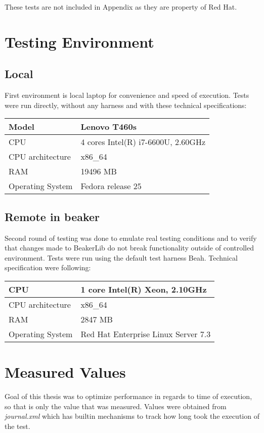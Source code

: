These tests are not included in Appendix as they are property of Red Hat.

\section{Testing Environment}

\subsection{Local}
First environment is local laptop for convenience and speed of execution. Tests were run directly, without any harness and with these technical specifications:  %

\begin{center}
    \begin{tabular}{| l | l |}
    \hline
    Model & Lenovo T460s \\ \hline
    CPU & 4 cores Intel(R) i7-6600U, 2.60GHz \\ \hline
    CPU architecture & x86\_64 \\ \hline
    RAM & 19496 MB   \\ \hline
    Operating System & Fedora release 25 \\ \hline
    \end{tabular}
\end{center}

\subsection{Remote in beaker}
Second round of testing was done to emulate real testing conditions and to verify that changes made to BeakerLib do not break functionality outside of controlled environment. Tests were run using the default test harness Beah. Technical specification were following:

\begin{center}
    \begin{tabular}{| l | l |}
    \hline
    CPU & 1 core Intel(R) Xeon, 2.10GHz \\ \hline
    CPU architecture & x86\_64 \\ \hline
    RAM & 2847 MB   \\ \hline
    Operating System & Red Hat Enterprise Linux Server 7.3 \\ \hline
    \end{tabular}
\end{center}


\section{Measured Values} %
Goal of this thesis was to optimize performance in regards to time of execution, so that is only the value that was measured. Values were obtained from \textit{journal.xml} which has builtin mechanisms to track how long took the execution of the test.

